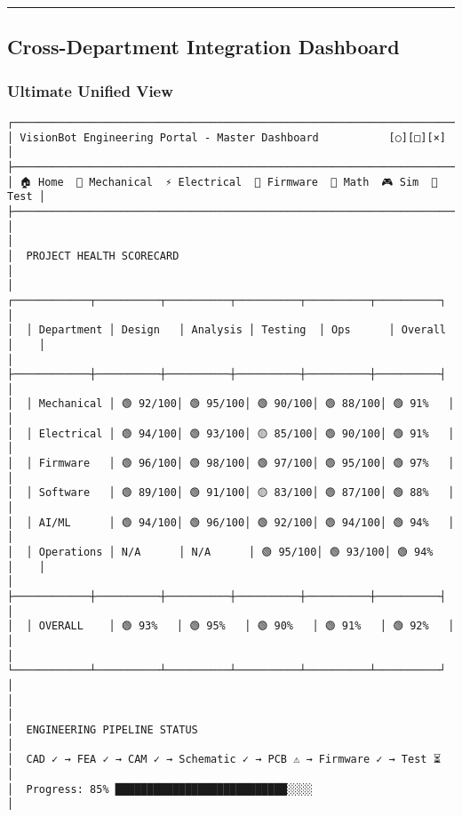 \documentclass[
]{article}
\begin{document}
\begin{center}\rule{0.5\linewidth}{0.5pt}\end{center}

\hypertarget{cross-department-integration-dashboard}{%
\subsection{Cross-Department Integration
Dashboard}\label{cross-department-integration-dashboard}}

\hypertarget{ultimate-unified-view}{%
\subsubsection{Ultimate Unified View}\label{ultimate-unified-view}}

\begin{verbatim}
┌────────────────────────────────────────────────────────────────────────────┐
│ VisionBot Engineering Portal - Master Dashboard           [○][□][×]        │
├────────────────────────────────────────────────────────────────────────────┤
│ 🏠 Home  📐 Mechanical  ⚡ Electrical  🔧 Firmware  🧮 Math  🎮 Sim  🔬 Test │
├────────────────────────────────────────────────────────────────────────────┤
│                                                                            │
│  PROJECT HEALTH SCORECARD                                                  │
│  ┌────────────┬──────────┬──────────┬──────────┬──────────┬──────────┐    │
│  │ Department │ Design   │ Analysis │ Testing  │ Ops      │ Overall  │    │
│  ├────────────┼──────────┼──────────┼──────────┼──────────┼──────────┤    │
│  │ Mechanical │ 🟢 92/100│ 🟢 95/100│ 🟢 90/100│ 🟢 88/100│ 🟢 91%   │    │
│  │ Electrical │ 🟢 94/100│ 🟢 93/100│ 🟡 85/100│ 🟢 90/100│ 🟢 91%   │    │
│  │ Firmware   │ 🟢 96/100│ 🟢 98/100│ 🟢 97/100│ 🟢 95/100│ 🟢 97%   │    │
│  │ Software   │ 🟢 89/100│ 🟢 91/100│ 🟡 83/100│ 🟢 87/100│ 🟢 88%   │    │
│  │ AI/ML      │ 🟢 94/100│ 🟢 96/100│ 🟢 92/100│ 🟢 94/100│ 🟢 94%   │    │
│  │ Operations │ N/A      │ N/A      │ 🟢 95/100│ 🟢 93/100│ 🟢 94%   │    │
│  ├────────────┼──────────┼──────────┼──────────┼──────────┼──────────┤    │
│  │ OVERALL    │ 🟢 93%   │ 🟢 95%   │ 🟢 90%   │ 🟢 91%   │ 🟢 92%   │    │
│  └────────────┴──────────┴──────────┴──────────┴──────────┴──────────┘    │
│                                                                            │
│  ENGINEERING PIPELINE STATUS                                               │
│  CAD ✓ → FEA ✓ → CAM ✓ → Schematic ✓ → PCB ⚠ → Firmware ✓ → Test ⏳     │
│  Progress: 85% ███████████████████████████░░░░                            │

\end{verbatim}
\end{document}
